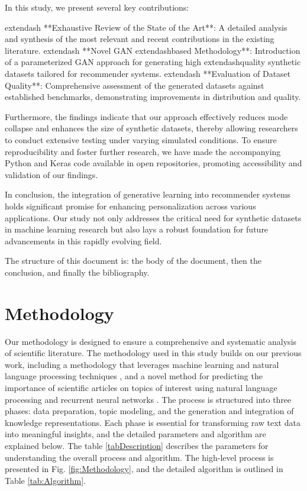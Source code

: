 \documentclass[runningheads]{llncs}
\begin{document}
In this study, we present several key contributions:

	extendash{} **Exhaustive Review of the State of the Art**: A detailed analysis and synthesis of the most relevant and recent contributions in the existing literature.
	extendash{} **Novel GAN	extendash{}based Methodology**: Introduction of a parameterized GAN approach for generating high	extendash{}quality synthetic datasets tailored for recommender systems.
	extendash{} **Evaluation of Dataset Quality**: Comprehensive assessment of the generated datasets against established benchmarks, demonstrating improvements in distribution and quality.

Furthermore, the findings indicate that our approach effectively reduces mode collapse and enhances the size of synthetic datasets, thereby allowing researchers to conduct extensive testing under varying simulated conditions. To ensure reproducibility and foster further research, we have made the accompanying Python and Keras code available in open repositories, promoting accessibility and validation of our findings.

In conclusion, the integration of generative learning into recommender systems holds significant promise for enhancing personalization across various applications. Our study not only addresses the critical need for synthetic datasets in machine learning research but also lays a robust foundation for future advancements in this rapidly evolving field.

\begin{thebibliography}{}
\end{thebibliography}

\newcommand{\listRefsPaper}{ref1, ref2, ref3}
 The structure of this document is: the body of the document, then the conclusion, and finally the bibliography.
\section{Methodology}

Our methodology is designed to ensure a comprehensive and systematic analysis of scientific literature. The methodology used in this study builds on our previous work, including a methodology that leverages machine learning and natural language processing techniques \cite{Hurtado2023}, and a novel method for predicting the importance of scientific articles on topics of interest using natural language processing and recurrent neural networks \cite{Lopez2024}. The process is structured into three phases: data preparation, topic modeling, and the generation and integration of knowledge representations. Each phase is essential for transforming raw text data into meaningful insights, and the detailed parameters and algorithm are explained below. The table \ref{tabDescription} describes the parameters for understanding the overall process and algorithm. The high-level process is presented in Fig. \ref{fig:Methodology}, and the detailed algorithm is outlined in Table \ref{tab:Algorithm}.\\ 
\end{document}
